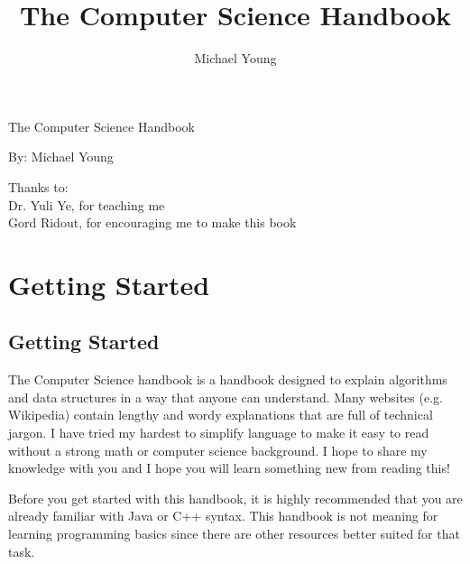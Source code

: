\documentclass[11pt,oneside]{book}
\title{The Computer Science Handbook}
\author{Michael Young}
\begin{document}
  \begin{titlepage}
  \vspace*{\fill}
  \begin{center}
  \LARGE\textsf{The Computer Science Handbook}\par
  \end{center}
  \begin{center}
  \textsf{By: Michael Young}\par
  \end{center}
  \vspace*{\fill}
  \end{titlepage}
  
  \maketitle

  \frontmatter
  
  \vspace*{\fill}
  \begin{center}
  Thanks to: \\
  Dr. Yuli Ye, for teaching me\\
  Gord Ridout, for encouraging me to make this book\\
  \end{center}
  \vspace*{\fill}

  \mainmatter

  \tableofcontents
  \chapter{ Getting Started }
    \section{ Getting Started }
    

The Computer Science handbook is a handbook designed to explain algorithms and data structures in a way that anyone can understand. Many websites (e.g. Wikipedia) contain lengthy and wordy explanations that are full of technical jargon. I have tried my hardest to simplify language to make it easy to read without a strong math or computer science background. I hope to share my knowledge with you and I hope you will learn something new from reading this!

Before you get started with this handbook, it is highly recommended that you are already familiar with Java or C++ syntax. This handbook is not meaning for learning programming basics since there are other resources better suited for that task.
\end{document}
